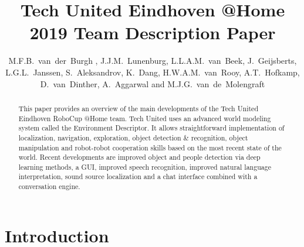 \documentclass[runningheads,a4paper]{llncs}
\begin{document}

\title{Tech United Eindhoven @Home \\2019 Team Description Paper}

\author{M.F.B.~van~der~Burgh , J.J.M.~Lunenburg, L.L.A.M.~van~Beek,
J.~Geijsberts, L.G.L.~Janssen, S.~Aleksandrov, K.~Dang,
H.W.A.M.~van~Rooy, A.T.~Hofkamp, D.~van~Dinther, A.~Aggarwal and M.J.G.~van~de~Molengraft}




\maketitle
%
%
%
\begin{abstract}
This paper provides an overview of the main developments of the Tech United Eindhoven RoboCup @Home team. Tech United uses an advanced world modeling system called the Environment Descriptor. It allows straightforward implementation of localization, navigation, exploration, object detection \& recognition, object manipulation and robot-robot cooperation skills based on the most recent state of the world. Recent developments are improved object and people detection via deep learning methods, a GUI, improved speech recognition, improved natural language interpretation, sound source localization and a chat interface combined with a conversation engine.

\end{abstract}
%
%
%

\section{Introduction}

\end{document}
